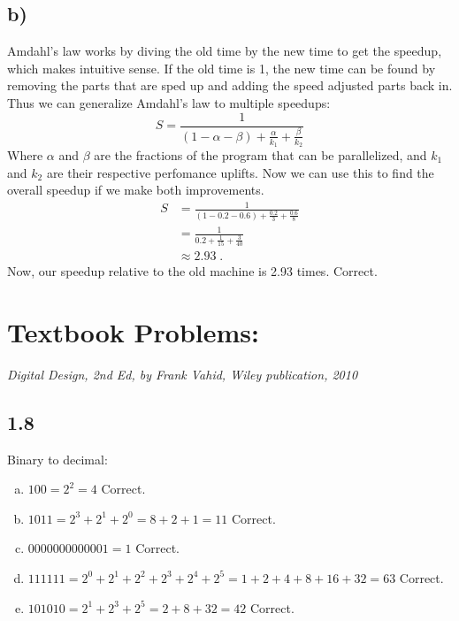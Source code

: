 \documentclass{article}
\begin{document}
\subsection*{b)}
Amdahl's law works by diving the old time by the new time to get the speedup, which makes intuitive sense.
If the old time is 1, the new time can be found by removing the parts that are sped up and adding the speed adjusted parts back in.
Thus we can generalize Amdahl's law to multiple speedups:
$$ S = \frac{1}{(1 - \alpha - \beta) + \frac{\alpha}{k_1} + \frac{\beta}{k_2}} $$
Where $\alpha$ and $\beta$ are the fractions of the program that can be parallelized, and $k_1$ and $k_2$ are their respective perfomance uplifts.
Now we can use this to find the overall speedup if we make both improvements.
\begin{align*}
    S &= \frac{1}{(1 - 0.2 - 0.6) + \frac{0.2}{3} + \frac{0.6}{8}} \\
    &= \frac{1}{0.2 + \frac{1}{15} + \frac{3}{40}} \\
    &\approx 2.93 \; .
\end{align*}
Now, our speedup relative to the old machine is 2.93 times.
\textcolor{mygreen}{Correct.}

\newpage
\section*{Textbook Problems:}
\textit{Digital Design, 2nd Ed, by Frank Vahid, Wiley publication, 2010}

\subsection*{1.8}
Binary to decimal:
\begin{enumerate}[(a)]
    \item $100 = 2^2 = 4$ \textcolor{mygreen}{Correct.}
    \item $1011 = 2^3 + 2^1 + 2^0 = 8 + 2 + 1 = 11$ \textcolor{mygreen}{Correct.}
    \item $0000000000001 = 1$ \textcolor{mygreen}{Correct.}
    \item $111111 = 2^0 + 2^1 + 2^2 + 2^3 + 2^4 + 2^5 = 1 + 2 + 4 + 8 + 16 + 32 = 63$ \textcolor{mygreen}{Correct.}
    \item $101010 = 2^1 + 2^3 + 2^5 = 2 + 8 + 32 = 42$ \textcolor{mygreen}{Correct.}
\end{enumerate}
\end{document}
